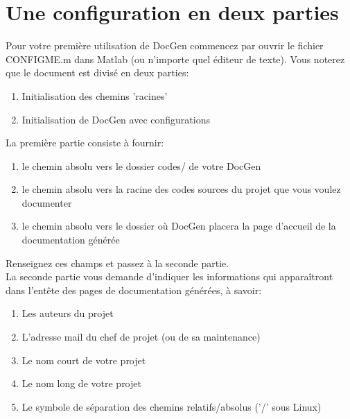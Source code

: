 \documentclass[./standalone.tex]{subfiles}
\begin{document}
\bigskip

\section{Une configuration en deux parties}
Pour votre première utilisation de DocGen commencez par ouvrir le fichier CONFIGME.m dans Matlab (ou n'importe quel éditeur de texte). Vous noterez que le document est divisé en deux parties:\\

\begin{enumerate}
    \item Initialisation des chemins 'racines'
    \item Initialisation de DocGen avec configurations\\
\end{enumerate}

La première partie consiste à fournir:\\

\begin{enumerate}
    \item le chemin absolu vers le dossier codes/ de votre DocGen
    \item le chemin absolu vers la racine des codes sources du projet que vous voulez documenter
    \item le chemin absolu vers le dossier où DocGen placera la page d'accueil de la documentation générée\\
\end{enumerate}

Renseignez ces champs et passez à la seconde partie.\\

La seconde partie vous demande d'indiquer les informations qui apparaîtront dans l'entête des pages de documentation générées, à savoir:\\

\begin{enumerate}
    \item Les auteurs du projet
    \item L'adresse mail du chef de projet (ou de sa maintenance)
    \item Le nom court de votre projet
    \item Le nom long de votre projet
    \item Le symbole de séparation des chemins relatifs/absolus ('/' sous Linux)\\
\end{enumerate}
\end{document}
